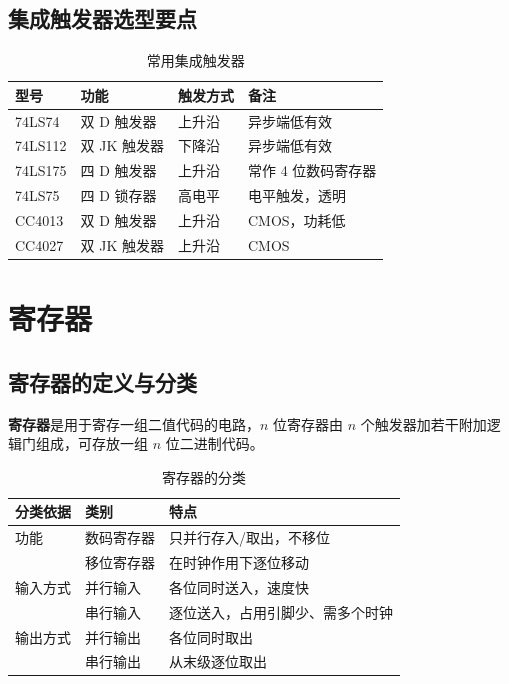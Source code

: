 \subsection{集成触发器选型要点}
\begin{table}[!htbp]
\centering
\caption{常用集成触发器}
\begin{tabular}{llll}
\toprule
型号 & 功能 & 触发方式 & 备注 \\
\midrule
74LS74 & 双 D 触发器 & 上升沿 & 异步端低有效 \\
74LS112 & 双 JK 触发器 & 下降沿 & 异步端低有效 \\
74LS175 & 四 D 触发器 & 上升沿 & 常作 4 位数码寄存器 \\
74LS75 & 四 D 锁存器 & 高电平 & 电平触发，透明 \\
CC4013 & 双 D 触发器 & 上升沿 & CMOS，功耗低 \\
CC4027 & 双 JK 触发器 & 上升沿 & CMOS \\
\bottomrule
\end{tabular}
\end{table}

\section{寄存器}
\subsection{寄存器的定义与分类}
\textbf{寄存器}是用于寄存一组二值代码的电路，$n$ 位寄存器由 $n$ 个触发器加若干附加逻辑门组成，可存放一组 $n$ 位二进制代码。

\begin{table}[!htbp]
\centering
\caption{寄存器的分类}
\begin{tabular}{lll}
\toprule
分类依据 & 类别 & 特点 \\
\midrule
功能 & 数码寄存器 & 只并行存入/取出，不移位 \\
 & 移位寄存器 & 在时钟作用下逐位移动 \\
输入方式 & 并行输入 & 各位同时送入，速度快 \\
 & 串行输入 & 逐位送入，占用引脚少、需多个时钟 \\
输出方式 & 并行输出 & 各位同时取出 \\
 & 串行输出 & 从末级逐位取出 \\
\bottomrule
\end{tabular}
\end{table}


